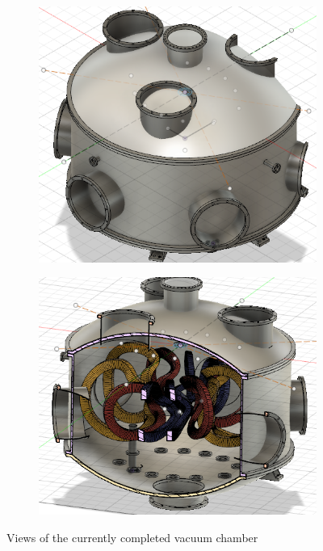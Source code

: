 \begin{figure}[H]
    \centering
    \begin{subfigure}[b]{0.4\textwidth}
        \centering
        \includegraphics[width=1\textwidth]{sections/imges/vacuum_vessel/Vakuumkammer_final.PNG}
        \label{fig:Kammer}
    \end{subfigure}
    \hfill
    \begin{subfigure}[b]{0.4\textwidth}
        \centering
        \includegraphics[width=1\textwidth]{sections/imges/vacuum_vessel/Vakuumkammer_final_Schnitt.PNG}
        \label{fig:Kammer_Schnitt}
    \end{subfigure}
    \caption{Views of the currently completed vacuum chamber}
    \label{fig:Kammer_all}
\end{figure}

